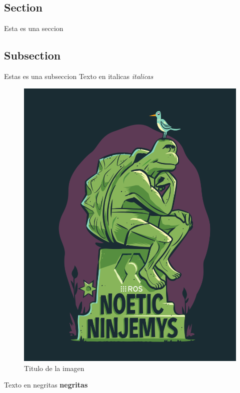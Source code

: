\documentclass{article}
\begin{document}
\begin{multicols}{2} %
\section*{Section}\label{seccion}  
Esta es una seccion
\subsection*{Subsection}\label{subseccion}                              	%
Estas es una subseccion
Texto en italicas \textit{italicas}

\begin{figure}[H]
	\centering
	\includegraphics[scale = 0.25]{1.png}
	\caption{Titulo de la imagen}
	\label{fig:label_fig}
\end{figure}

Texto en negritas \textbf{negritas}


\end{multicols}
\end{document}
